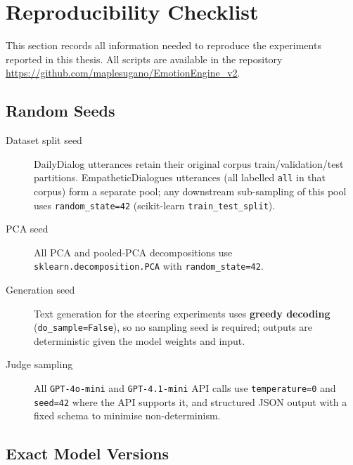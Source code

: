 \section{Reproducibility Checklist}
\label{app:reproducibility}

This section records all information needed to reproduce the experiments reported in this thesis. All scripts are available in the repository
\url{https://github.com/maplesugano/EmotionEngine_v2}.

\subsection*{Random Seeds}

\begin{description}
  \item[Dataset split seed] DailyDialog utterances retain their original corpus train/validation/test partitions. EmpatheticDialogues utterances (all labelled \texttt{all} in that corpus) form a separate pool; any downstream sub-sampling of this pool uses \texttt{random\_state=42} (scikit-learn \texttt{train\_test\_split}).

  \item[PCA seed] All PCA and pooled-PCA decompositions use
    \texttt{sklearn.decomposition.PCA} with \texttt{random\_state=42}.

  \item[Generation seed] Text generation for the steering experiments uses
    \textbf{greedy decoding} (\texttt{do\_sample=False}), so no sampling seed is
    required; outputs are deterministic given the model weights and input.

  \item[Judge sampling] All \texttt{GPT-4o-mini} and \texttt{GPT-4.1-mini} API calls
    use \texttt{temperature=0} and \texttt{seed=42} where the API supports it, and
    structured JSON output with a fixed schema to minimise non-determinism.
\end{description}

\subsection*{Exact Model Versions}

